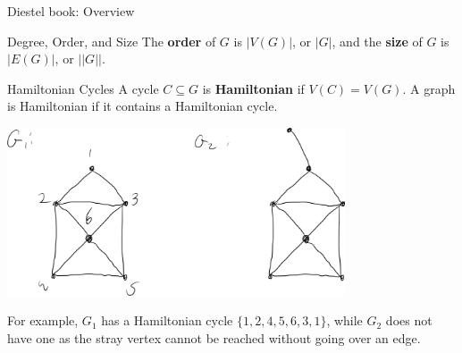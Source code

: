 \documentclass[10pt]{extarticle}
\begin{document}
{\begin{problem}{Diestel book: Overview}
\begin{problem}{Degree, Order, and Size}
      The \textbf{order} of $G$ is $|V(G)|$, or $|G|$, and the \textbf{size} of $G$ is $|E(G)|$, or $||G||$.
    \end{problem}
    \begin{problem}{Hamiltonian Cycles}
      A cycle $C\subseteq G$ is \textbf{Hamiltonian} if $V(C) = V(G)$. A graph is Hamiltonian if it contains a Hamiltonian cycle.
      \begin{center}
        \includegraphics[width=0.75\textwidth]{hamiltonian}
      \end{center}
      For example, $G_1$ has a Hamiltonian cycle $\{1,2,4,5,6,3,1\}$, while $G_2$ does not have one as the stray vertex cannot be reached without going over an edge.\\


\end{problem}
\end{problem}}
\end{document}

